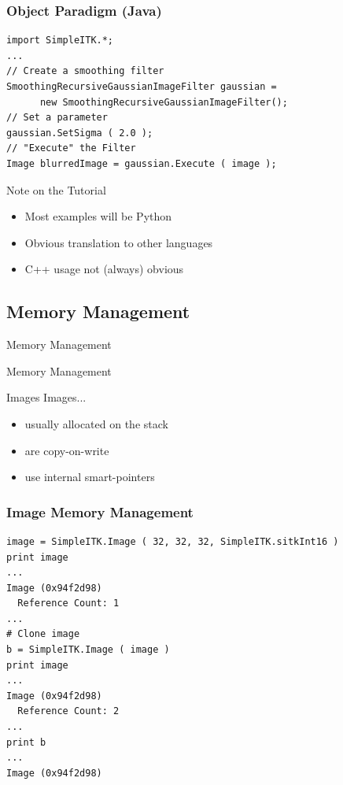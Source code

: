 \begin{frame}[fragile]
\frametitle{Object Paradigm (Java)}
\lstjava
\begin{lstlisting}
import SimpleITK.*;
...
// Create a smoothing filter
SmoothingRecursiveGaussianImageFilter gaussian =
      new SmoothingRecursiveGaussianImageFilter();
// Set a parameter
gaussian.SetSigma ( 2.0 );
// "Execute" the Filter
Image blurredImage = gaussian.Execute ( image );
\end{lstlisting}
\end{frame}


\begin{frame}{Note on the Tutorial}
\begin{itemize}
  \item Most examples will be Python
  \item Obvious translation to other languages
  \item C++ usage not (always) obvious
\end{itemize}
\end{frame}

\subsection{Memory Management}

\begin{frame}{Memory Management}
\fontsize{36pt}{36pt}\selectfont
\center
\begin{center}
Memory Management
\end{center}
\end{frame}


\begin{frame}{Images}
Images...
\begin{itemize}
  \item usually allocated on the stack
  \item are copy-on-write
  \item use internal smart-pointers
\end{itemize}
\end{frame}

\begin{frame}[fragile]
\frametitle{Image Memory Management}
\lstpython
\begin{lstlisting}
image = SimpleITK.Image ( 32, 32, 32, SimpleITK.sitkInt16 )
print image
...
Image (0x94f2d98)
  Reference Count: 1
...
# Clone image
b = SimpleITK.Image ( image )
print image
...
Image (0x94f2d98)
  Reference Count: 2
...
print b
...
Image (0x94f2d98)
\end{lstlisting}
\end{frame}

